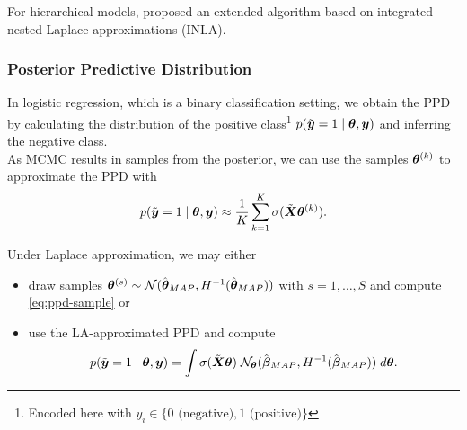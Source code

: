 For hierarchical models, \citet{rue_approximate_2009} proposed an extended algorithm based on integrated nested Laplace approximations (INLA).

\subsubsection*{Posterior Predictive Distribution}

In logistic regression, which is a binary classification setting, we obtain the PPD by calculating the distribution of the positive class\footnote{
    Encoded here with $y_i \in \{0 \text{ (negative)}, 1 \text{ (positive)}\}$
} $p(\tilde{\bm{y}} = 1 \mid \bm{\theta}, \bm{y})$ and inferring the negative class.\\

As MCMC results in samples from the posterior, we can use the samples $\bm{\theta}^{(k)}$ to approximate the PPD with
\begin{equation}\label{eq:ppd-sample}
    p(\tilde{\bm{y}} = 1 \mid \bm{\theta}, \bm{y}) \approx \frac{1}{K} \sum_{k=1}^{K} \sigma(\tilde{\bm{X}} \bm{\theta}^{(k)}).
\end{equation}

Under Laplace approximation, we may either
\begin{itemize}
    \item draw samples $\bm{\theta}^{(s)} \sim \mathcal{N}(\hat{\bm{\theta}}_{MAP}, H^{-1}(\hat{\bm{\theta}}_{MAP}))$ with $s = 1, \dots, S$ and compute \autoref{eq:ppd-sample} or
    \item use the LA-approximated PPD and compute
    \begin{equation*}
        p(\tilde{\bm{y}} = 1 \mid \bm{\theta}, \bm{y}) = \int \sigma(\tilde{\bm{X}} \bm{\theta}) \; \mathcal{N}_{\bm{\theta}}(\hat{\bm{\beta}}_{MAP}, H^{-1} (\hat{\bm{\beta}}_{MAP})) \; d \bm{\theta}.
    \end{equation*}
\end{itemize}
